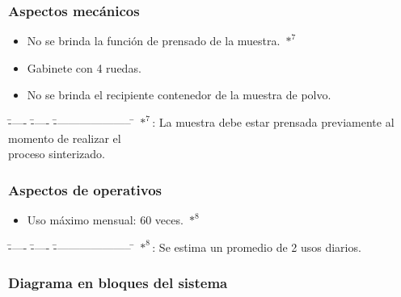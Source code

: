     \subsubsection{Aspectos mecánicos}
      \begin{itemize}
	\item No se brinda la función de prensado de la muestra. $*^{7}$
	\item Gabinete con 4 ruedas. 
	\item No se brinda el recipiente contenedor de la muestra de polvo.
      \end{itemize}

      \begin{tabbing}
       \= ----- \= ----- \= --------------------- \= \kill
	\> $*^{7}$: \>  La muestra debe estar prensada previamente al momento de realizar el \\
	    \>\>	proceso sinterizado.\\
      \end{tabbing}

    \subsubsection{Aspectos de operativos}
      \begin{itemize}
	\item Uso máximo mensual: 60 veces. $*^{8}$
      \end{itemize}
    
      \begin{tabbing}
	\= ----- \= ----- \= --------------------- \= \kill
	\> $*^{8}$: \>Se estima un promedio de 2 usos diarios. \\
      \end{tabbing}

\newpage

    \subsubsection{Diagrama en bloques del sistema }

